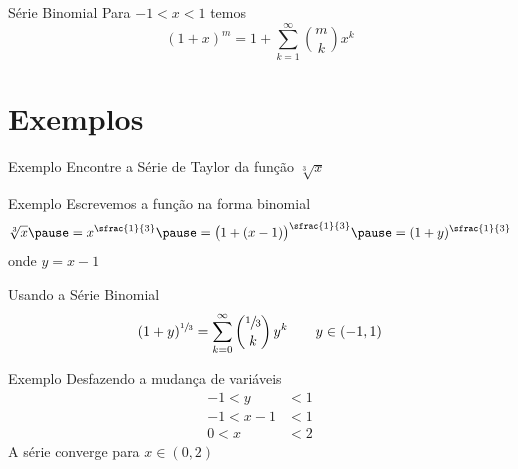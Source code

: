 \begin{frame}{Série Binomial}
Para \(-1<x<1\) temos
\[ (1+x)^m = 1 + \sum_{k=1}^{\infty} \binom{m}{k} x^k \]
\end{frame}

\section{Exemplos}

\addtocounter{exemplo}{1}
\begin{frame}{Exemplo \theexemplo}
  Encontre a Série de Taylor da função $\sqrt[3]{x}$
\end{frame}

\begin{frame}{Exemplo \theexemplo}
  Escrevemos a função na forma binomial
  \[
    \sqrt[3]{x}
    \pause
    = x^{\sfrac{1}{3}}
    \pause
    = \big(1 + (x-1)\big)^{\sfrac{1}{3}}
    \pause
    = (1+y)^{\sfrac{1}{3}}
  \]
  onde $y=x-1$

  \pause
  \vspace{\baselineskip}
  Usando a Série Binomial
  \[
    (1+y)^{\sfrac{1}{3}} = \sum_{k=0}^\infty \binom{\sfrac{1}{3}}{k}\, y^k
    \qquad y \in(-1, 1)
  \]
\end{frame}

\begin{frame}{Exemplo \theexemplo}
    Desfazendo a mudança de variáveis
    \begin{align*}
        -1 < y & < 1 \\
        -1 < x-1 & < 1 \\
        0 < x & < 2
    \end{align*}
    A série converge para $x \in(0, 2)$
\end{frame}

